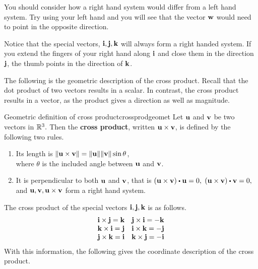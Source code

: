 You should consider how a right hand
system would differ from a left hand system. Try using your left hand and
you will see that the vector ${\bf w}$ would need to point in the
opposite direction.

Notice that the special vectors, ${\bf i},{\bf j},{\bf k}$ will always form a right handed
system. If you extend the fingers of your right hand along ${\bf i}$ and 
close them in the direction ${\bf j}$, the thumb points
in the direction of ${\bf k}$.

\begin{center}
\end{center}

The following is the geometric description of the cross product. Recall that the dot product of 
two vectors results in a scalar. In contrast, the cross product results in a vector, as the product gives
a direction as well as magnitude.

\begin{definition}{Geometric definition of cross product}{crossprodgeomet}
Let ${\bf u}$ and ${\bf v}$ be two vectors in $\mathbb{R}^{3}.$ 
Then the \textbf{cross product}, written ${\bf u}\times {\bf v}$, is defined by
 the following two rules.

\begin{enumerate}
\item Its length is $\|{\bf u}\times {\bf v}\| =\|{\bf u}\| \|
{\bf v}\| \sin \theta $, \\
where $\theta $ is the included angle between ${\bf u}$ and ${\bf v}$.

\item It is perpendicular to both ${\bf u}$ and ${\bf v}$, that is $\tup{\vect{u}\times \vect{v} } \dotprod \vect{u}=0,$ $\tup{\vect{u}\times \vect{v} } \dotprod \vect{v}=0,$ \\
and  ${\bf u},{\bf v},{\bf u}\times {\bf v}$ form a right hand system.
\end{enumerate}
\end{definition}

The cross product of the special vectors ${\bf i}, {\bf j},
{\bf k}$ is as follows.  
\begin{equation*}
\begin{array}{cc}
{\bf i}\times {\bf j}={\bf k} & {\bf j}\times {\bf i}=-{\bf k} \\
{\bf k}\times {\bf i}={\bf j} & {\bf i}\times {\bf k}=-{\bf j} \\
{\bf j}\times {\bf k}={\bf i} & {\bf k}\times {\bf j}=-{\bf i}
\end{array}
\end{equation*}
With this information, the following gives the coordinate description of the
cross product.

